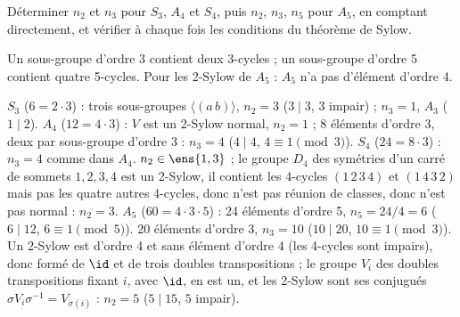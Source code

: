 \begin{exo}
Déterminer $n_2$ et $n_3$ pour $S_3$, $A_4$ et $S_4$, puis $n_2$, $n_3$, $n_5$ pour $A_5$, en comptant directement, et vérifier à chaque fois les conditions du théorème de Sylow.
\begin{indication}
Un sous-groupe d'ordre 3 contient deux 3-cycles ; un sous-groupe d'ordre 5 contient quatre 5-cycles. Pour les 2-Sylow de $A_5$ : $A_5$ n'a pas d'élément d'ordre 4.
\end{indication}
\begin{corrige}
$S_3$ ($6=2\cdot3$) : trois sous-groupes $\langle(a\,b)\rangle$, $n_2=3$ ($3\mid3$, $3$ impair) ; $n_3=1$, $A_3$ ($1\mid2$).
$A_4$ ($12=4\cdot3$) : $V$ est un 2-Sylow normal, $n_2=1$ ; 8 éléments d'ordre 3, deux par sous-groupe d'ordre 3 : $n_3=4$ ($4\mid4$, $4\equiv1\pmod3$).
$S_4$ ($24=8\cdot3$) : $n_3=4$ comme dans $A_4$. $n_2\in\ens{1,3}$ ; le groupe $D_4$ des symétries d'un carré de sommets $1,2,3,4$ est un 2-Sylow, il contient les 4-cycles $(1\,2\,3\,4)$ et $(1\,4\,3\,2)$ mais pas les quatre autres 4-cycles, donc n'est pas réunion de classes, donc n'est pas normal : $n_2=3$.
$A_5$ ($60=4\cdot3\cdot5$) : 24 éléments d'ordre 5, $n_5=24/4=6$ ($6\mid12$, $6\equiv1\pmod5$). 20 éléments d'ordre 3, $n_3=10$ ($10\mid20$, $10\equiv1\pmod3$). Un 2-Sylow est d'ordre 4 et sans élément d'ordre 4 (les 4-cycles sont impairs), donc formé de $\id$ et de trois doubles transpositions ; le groupe $V_i$ des doubles transpositions fixant $i$, avec $\id$, en est un, et les 2-Sylow sont ses conjugués $\sigma V_i\sigma^{-1}=V_{\sigma(i)}$ : $n_2=5$ ($5\mid15$, $5$ impair).
\end{corrige}
\end{exo}

